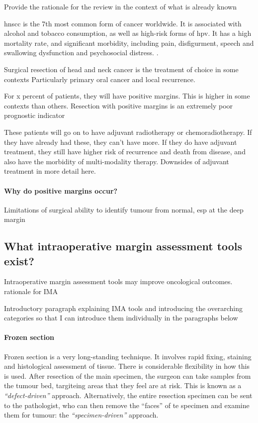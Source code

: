 
Provide the rationale for the review in the context of what is already known

\Gls{hnscc} is the 7th most common form of cancer worldwide. 
It is associated with alcohol and tobacco consumption, as well as high-risk forms of \gls{hpv}.
It has a high mortality rate, and significant morbidity, including pain, disfigurment, speech and swallowing dysfunction and psychosocial distress. \cite{chowHeadNeckCancer2020}.



Surgical resection of head and neck cancer is the treatment of choice in some contexts
Particularly primary oral cancer and local recurrence.

For x percent of patients, they will have positive margins. 
This is higher in some contexts than others.
Resection with positive margins is an extremely poor prognostic indicator

These patients will go on to have adjuvant radiotherapy or chemoradiotherapy.
If they have already had these, they can't have more.
If they do have adjuvant treatment, they still have higher risk of recurrence and death from disease, and also have the morbidity of multi-modality therapy.
Downsides of adjuvant treatment in more detail here.

\paragraph{Why do positive margins occur?}
Limitations of surgical ability to identify tumour from normal, esp at the deep margin


\subsection{What intraoperative margin assessment tools exist?}

Intraoperative margin assessment tools may improve oncological outcomes.
rationale for IMA

Introductory paragraph explaining IMA tools and introducing the overarching categories so that I can introduce them individually in the paragraphs below

\paragraph{Frozen section}

Frozen section is a very long-standing technique.
It involves rapid fixing, staining and histological assessment of tissue.
There is considerable flexibility in how this is used.
After resection of the main specimen, the surgeon can take samples from the tumour bed, targiteing areas that they feel are at risk.
This is known as a \emph{``defect-driven''} approach.
Alternatively, the entire resection specimen can be sent to the pathologist, who can then remove the ``faces'' of te specimen and examine them for tumour: the \emph{``specimen-driven''} approach.

